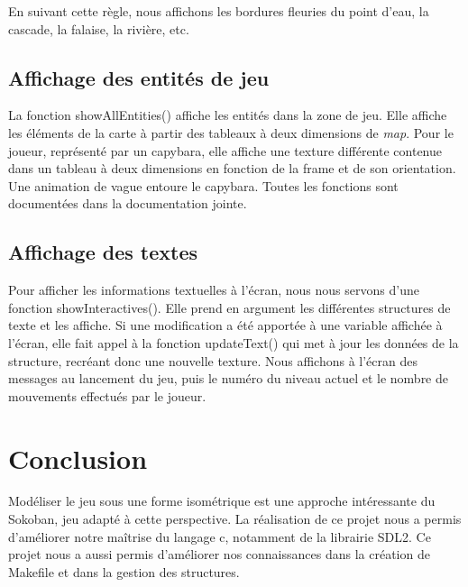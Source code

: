 \documentclass[french, 12pt]{article}
\begin{document}
    En suivant cette règle, nous affichons les bordures fleuries du point d'eau, la cascade, la falaise, la rivière, etc.

    \subsection{Affichage des entités de jeu}

    La fonction showAllEntities() affiche les entités dans la zone de jeu.
    Elle affiche les éléments de la carte à partir des tableaux à deux dimensions de \textit{map}.
    Pour le joueur, représenté par un capybara, elle affiche une texture différente contenue dans un tableau à deux dimensions en fonction de la frame et de son orientation. Une animation de vague entoure le capybara.
    Toutes les fonctions sont documentées dans la documentation jointe.

    \subsection{Affichage des textes}

    Pour afficher les informations textuelles à l'écran, nous nous servons d'une fonction showInteractives(). Elle prend en argument les différentes structures de texte et les affiche. Si une modification a été apportée à une variable affichée à l'écran, elle fait appel à la fonction updateText() qui met à jour les données de la structure, recréant donc une nouvelle texture.
    Nous affichons à l'écran des messages au lancement du jeu, puis le numéro du niveau actuel et le nombre de mouvements effectués par le joueur.

\section{Conclusion}

Modéliser le jeu sous une forme isométrique est une approche intéressante du Sokoban, jeu adapté à cette perspective. La réalisation de ce projet nous a permis d'améliorer notre maîtrise du langage c, notamment de la librairie SDL2. Ce projet nous a aussi permis d'améliorer nos connaissances dans la création de Makefile et dans la gestion des structures.
\end{document}
